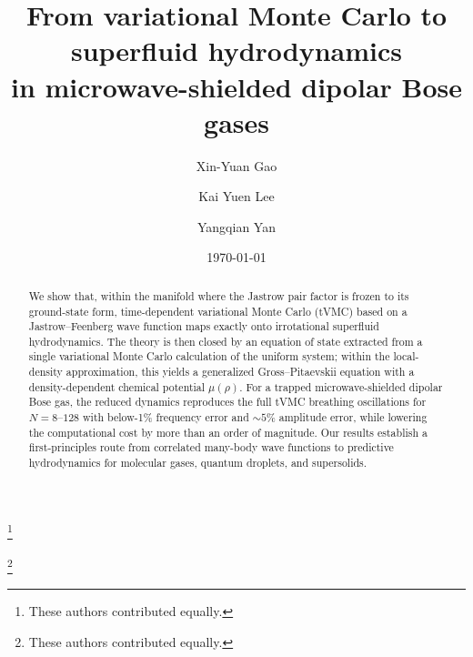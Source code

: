 \documentclass[aps,prl,twocolumn,superscriptaddress,longbibliography]{revtex4-2}
\begin{document}
\title{From variational Monte Carlo to superfluid hydrodynamics\\
in microwave-shielded dipolar Bose gases}

\author{Xin-Yuan Gao}
\thanks{These authors contributed equally.}
%
\author{Kai Yuen Lee}
\thanks{These authors contributed equally.}
%
\author{Yangqian Yan}%
%

\date{\today}

\begin{abstract}
We show that, within the manifold where the Jastrow pair factor is
frozen to its ground-state form, time-dependent variational Monte Carlo
(tVMC) based on a Jastrow--Feenberg wave function maps exactly onto
irrotational superfluid hydrodynamics.  The theory is then closed by an
equation of state extracted from a single variational Monte Carlo
calculation of the uniform system; within the local-density
approximation, this yields a generalized Gross--Pitaevskii equation with
a density-dependent chemical potential $\mu(\rho)$.  For a trapped
microwave-shielded dipolar Bose gas, the reduced dynamics reproduces the
full tVMC breathing oscillations for $N=8$--$128$ with below-1\%
frequency error and $\sim\!5\%$ amplitude error, while lowering the
computational cost by more than an order of magnitude.  Our results
establish a first-principles route from correlated many-body wave
functions to predictive hydrodynamics for molecular gases, quantum
droplets, and supersolids.
\end{abstract}

\maketitle
\end{document}
